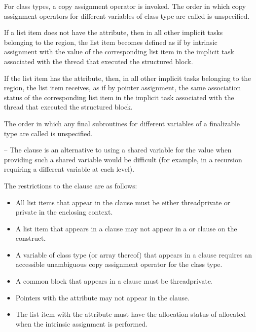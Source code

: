 \cppspecificstart
For class types, a copy assignment operator is invoked. The order in which copy 
assignment operators for different variables of class type are called is unspecified. 
\cppspecificend

\fortranspecificstart
If a list item does not have the  attribute, then in all other implicit tasks 
belonging to the  region, the list item becomes defined as if by intrinsic 
assignment with the value of the corresponding list item in the implicit task associated 
with the thread that executed the structured block. 

If the list item has the  attribute, then, in all other implicit tasks belonging to 
the  region, the list item receives, as if by pointer assignment, the same 
association status of the corresponding list item in the implicit task associated with the 
thread that executed the structured block.

The order in which any final subroutines for different variables of a finalizable type are called is unspecified.
\fortranspecificend

\notestart
\noteheader – The  clause is an alternative to using a shared variable for the 
value when providing such a shared variable would be difficult (for example, in a 
recursion requiring a different variable at each level). 
\noteend

\restrictions
The restrictions to the  clause are as follows:

\begin{itemize}
\item All list items that appear in the  clause must be either threadprivate 
or private in the enclosing context.

\item A list item that appears in a  clause may not appear in a  or
 clause on the  construct. 

\cppspecificstart
\item A variable of class type (or array thereof) that appears in a  clause 
requires an accessible unambiguous copy assignment operator for the class type.
\cppspecificend

\fortranspecificstart
\item A common block that appears in a  clause must be threadprivate. 

\item Pointers with the  attribute may not appear in the  
clause.
\item The list item with the  attribute must have the allocation status of allocated when the intrinsic assignment is performed. 
\fortranspecificend
\end{itemize}










